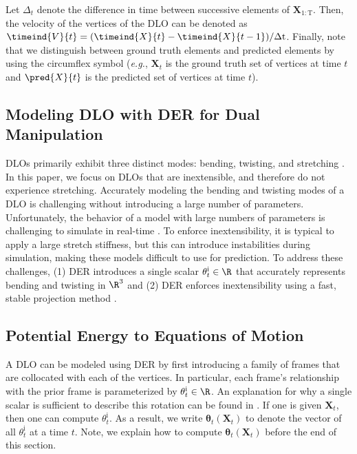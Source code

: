 Let $\Delta_t$ denote the difference in time between successive elements of $\textbf{X}_{1:\text{T}}$.
Then, the velocity of the vertices of the DLO can be denoted as $\timeind{V}{t}  = (\timeind{X}{t} - \timeind{X}{t-1})/\Delta \text{t}$.
Finally, note that we distinguish between ground truth elements and predicted elements by using the circumflex symbol (\textit{e.g.}, $\textbf{X}_{t}$ is the ground truth set of vertices at time $t$ and $\pred{X}{t}$ is the predicted set of vertices at time $t$).

\subsection{Modeling DLO with DER for Dual Manipulation}
\label{sec:DER}

DLOs primarily exhibit three distinct modes: bending, twisting, and stretching \cite{originalDER}. 
In this paper, we focus on DLOs that are inextensible, and therefore do not experience stretching.
Accurately modeling the bending and twisting modes of a DLO is challenging without introducing a large number of parameters.
Unfortunately, the behavior of a model with large numbers of parameters is challenging to simulate in real-time \cite{twistbendchallenge, twistbendchallenge2}.
To enforce inextensibility, it is typical to apply a large stretch stiffness, but this can introduce instabilities during simulation, making these models difficult to use for prediction.
To address these challenges, (1) DER introduces a single scalar $\theta^\text{i}_{t} \in \R$ that accurately represents bending and twisting in $\R^3$ and (2) DER enforces inextensibility using a fast, stable projection method \cite[Section 4]{fast_proj}. 

\subsection{Potential Energy to Equations of Motion} 

A DLO can be modeled using DER by first introducing a family of frames that are collocated with each of the vertices. 
In particular, each frame's relationship with the prior frame is parameterized by $\theta^\text{i}_t \in \R$.
An explanation for why a single scalar is sufficient to describe this rotation can be found in \cite[Section 4.2]{originalDER}.
If one is given $\textbf{X}_t$, then one can compute $\theta^\text{i}_t$.
As a result, we write $\bm{\theta}_t(\textbf{X}_t)$ to denote the vector of all $\theta^\text{i}_t$ at a time $t$.
Note, we explain how to compute $\bm{\theta}_t(\textbf{X}_t)$ before the end of this section.

